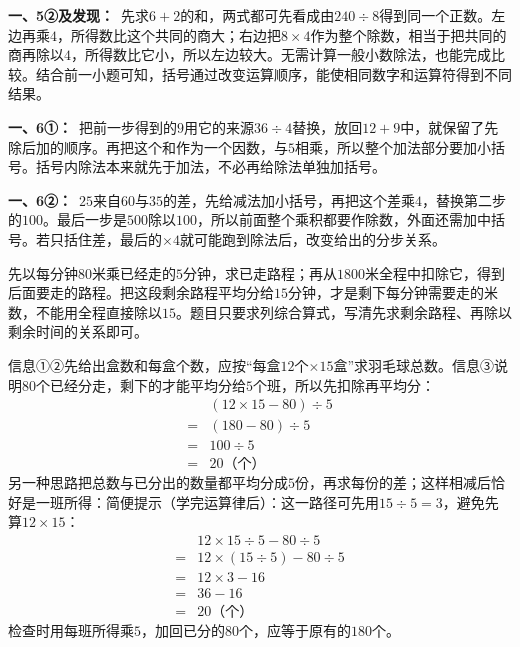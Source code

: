 \documentclass[multi=snippet,border=0pt]{standalone}
\newenvironment{snippet}[3]{\begin{minipage}{#1bp}\color{answerred}\fontsize{#2}{#3}\selectfont\raggedright}{\end{minipage}}
\begin{document}
\begin{snippet}{505}{11.5}{14}\textbf{一、5②及发现：}\ 先求\(6+2\)的和，两式都可先看成由\(240\div8\)得到同一个正数。左边再乘\(4\)，所得数比这个共同的商大；右边把\(8\times4\)作为整个除数，相当于把共同的商再除以\(4\)，所得数比它小，所以左边较大。无需计算一般小数除法，也能完成比较。结合前一小题可知，括号通过改变运算顺序，能使相同数字和运算符得到不同结果。\end{snippet}
\begin{snippet}{505}{11.5}{14}\textbf{一、6①：}\ 把前一步得到的\(9\)用它的来源\(36\div4\)替换，放回\(12+9\)中，就保留了先除后加的顺序。再把这个和作为一个因数，与\(5\)相乘，所以整个加法部分要加小括号。括号内除法本来就先于加法，不必再给除法单独加括号。\end{snippet}
\begin{snippet}{505}{11.5}{14}\textbf{一、6②：}\ \(25\)来自\(60\)与\(35\)的差，先给减法加小括号，再把这个差乘\(4\)，替换第二步的\(100\)。最后一步是\(500\)除以\(100\)，所以前面整个乘积都要作除数，外面还需加中括号。若只括住差，最后的\(\times4\)就可能跑到除法后，改变给出的分步关系。\end{snippet}
\begin{snippet}{505}{11.5}{14}先以每分钟\(80\)米乘已经走的\(5\)分钟，求已走路程；再从\(1800\)米全程中扣除它，得到后面要走的路程。把这段剩余路程平均分给\(15\)分钟，才是剩下每分钟需要走的米数，不能用全程直接除以\(15\)。题目只要求列综合算式，写清先求剩余路程、再除以剩余时间的关系即可。\end{snippet}
\begin{snippet}{505}{11.5}{14}信息①②先给出盒数和每盒个数，应按“每盒\(12\)个\(\times15\)盒”求羽毛球总数。信息③说明\(80\)个已经分走，剩下的才能平均分给\(5\)个班，所以先扣除再平均分：\[\begin{aligned}&(12\times15-80)\div5\\={}&(180-80)\div5\\={}&100\div5\\={}&20\text{（个）}\end{aligned}\]另一种思路把总数与已分出的数量都平均分成\(5\)份，再求每份的差；这样相减后恰好是一班所得：简便提示（学完运算律后）：这一路径可先用\(15\div5=3\)，避免先算\(12\times15\)：\[\begin{aligned}&12\times15\div5-80\div5\\={}&12\times(15\div5)-80\div5\\={}&12\times3-16\\={}&36-16\\={}&20\text{（个）}\end{aligned}\]检查时用每班所得乘\(5\)，加回已分的\(80\)个，应等于原有的\(180\)个。\end{snippet}
\end{document}
